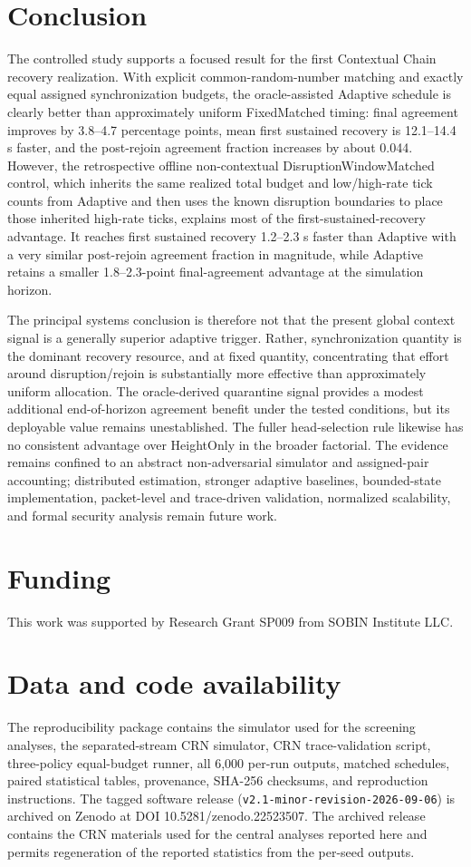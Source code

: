 \documentclass[11pt]{article}
\begin{document}
\section{Conclusion}
The controlled study supports a focused result for the first Contextual Chain recovery realization. With explicit common-random-number matching and exactly equal assigned synchronization budgets, the oracle-assisted Adaptive schedule is clearly better than approximately uniform FixedMatched timing: final agreement improves by 3.8--4.7 percentage points, mean first sustained recovery is 12.1--14.4 s faster, and the post-rejoin agreement fraction increases by about 0.044. However, the retrospective offline non-contextual DisruptionWindowMatched control, which inherits the same realized total budget and low/high-rate tick counts from Adaptive and then uses the known disruption boundaries to place those inherited high-rate ticks, explains most of the first-sustained-recovery advantage. It reaches first sustained recovery 1.2--2.3 s faster than Adaptive with a very similar post-rejoin agreement fraction in magnitude, while Adaptive retains a smaller 1.8--2.3-point final-agreement advantage at the simulation horizon.

The principal systems conclusion is therefore not that the present global context signal is a generally superior adaptive trigger. Rather, synchronization quantity is the dominant recovery resource, and at fixed quantity, concentrating that effort around disruption/rejoin is substantially more effective than approximately uniform allocation. The oracle-derived quarantine signal provides a modest additional end-of-horizon agreement benefit under the tested conditions, but its deployable value remains unestablished. The fuller head-selection rule likewise has no consistent advantage over HeightOnly in the broader factorial. The evidence remains confined to an abstract non-adversarial simulator and assigned-pair accounting; distributed estimation, stronger adaptive baselines, bounded-state implementation, packet-level and trace-driven validation, normalized scalability, and formal security analysis remain future work.

\section*{Funding}
This work was supported by Research Grant SP009 from SOBIN Institute LLC.

\section*{Data and code availability}
The reproducibility package contains the simulator used for the screening analyses, the separated-stream CRN simulator, CRN trace-validation script, three-policy equal-budget runner, all 6,000 per-run outputs, matched schedules, paired statistical tables, provenance, SHA-256 checksums, and reproduction instructions. The tagged software release (\texttt{v2.1-minor-revision-2026-09-06}) is archived on Zenodo at DOI 10.5281/zenodo.22523507. The archived release contains the CRN materials used for the central analyses reported here and permits regeneration of the reported statistics from the per-seed outputs.
\end{document}
